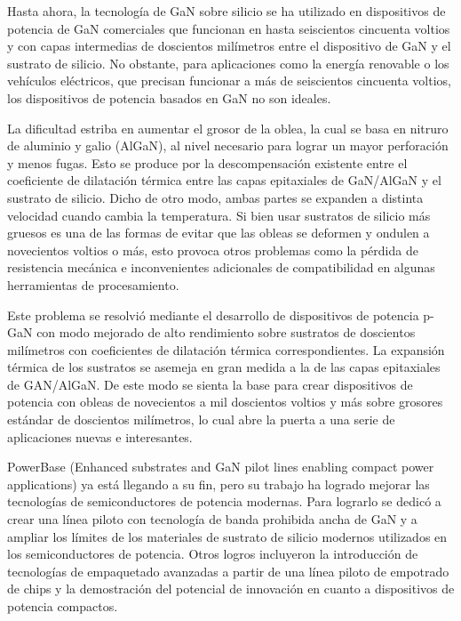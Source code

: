 \documentclass[12pt,letterpaper,superscriptaddress]{article}
\begin{document}
Hasta ahora, la tecnología de GaN sobre silicio se ha utilizado en dispositivos de potencia de GaN comerciales que funcionan en hasta seiscientos cincuenta voltios y con capas intermedias de doscientos milímetros entre el dispositivo de GaN y el sustrato de silicio. No obstante, para aplicaciones como la energía renovable o los vehículos eléctricos, que precisan funcionar a más de seiscientos cincuenta voltios, los dispositivos de potencia basados en GaN no son ideales.

La dificultad estriba en aumentar el grosor de la oblea, la cual se basa en nitruro de aluminio y galio (AlGaN), al nivel necesario para lograr un mayor perforación y menos fugas. Esto se produce por la descompensación existente entre el coeficiente de dilatación térmica entre las capas epitaxiales de GaN/AlGaN y el sustrato de silicio. Dicho de otro modo, ambas partes se expanden a distinta velocidad cuando cambia la temperatura. Si bien usar sustratos de silicio más gruesos es una de las formas de evitar que las obleas se deformen y ondulen a novecientos voltios o más, esto provoca otros problemas como la pérdida de resistencia mecánica e inconvenientes adicionales de compatibilidad en algunas herramientas de procesamiento.

Este problema se resolvió mediante el desarrollo de dispositivos de potencia p-GaN con modo mejorado de alto rendimiento sobre sustratos de doscientos milímetros con coeficientes de dilatación térmica correspondientes. La expansión térmica de los sustratos se asemeja en gran medida a la de las capas epitaxiales de GAN/AlGaN. De este modo se sienta la base para crear dispositivos de potencia con obleas de novecientos a mil doscientos voltios y más sobre grosores estándar de doscientos milímetros, lo cual abre la puerta a una serie de aplicaciones nuevas e interesantes.

PowerBase (Enhanced substrates and GaN pilot lines enabling compact power applications) ya está llegando a su fin, pero su trabajo ha logrado mejorar las tecnologías de semiconductores de potencia modernas. Para lograrlo se dedicó a crear una línea piloto con tecnología de banda prohibida ancha de GaN y a ampliar los límites de los materiales de sustrato de silicio modernos utilizados en los semiconductores de potencia. Otros logros incluyeron la introducción de tecnologías de empaquetado avanzadas a partir de una línea piloto de empotrado de chips y la demostración del potencial de innovación en cuanto a dispositivos de potencia compactos.

\clearpage
\end{document}

